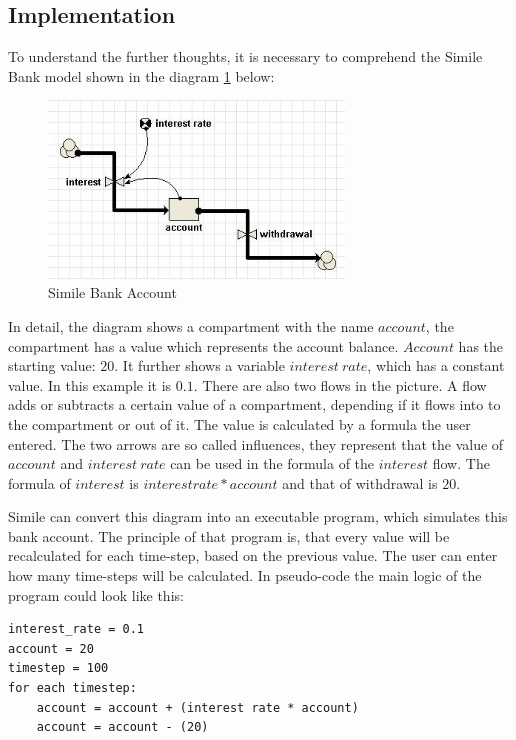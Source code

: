 \subsection{Implementation}
\par
To understand the further thoughts, it is necessary to comprehend the Simile Bank model shown in the diagram \ref{fig:simile_bank_account} below:
\begin{figure}[h]
	\centering
	\includegraphics[width=0.7\textwidth]{pics/generation_of_a_dsl/similie_bank_account.png}
	\caption{Simile Bank Account \label{fig:simile_bank_account}}	
\end{figure}
\par
In detail, the diagram shows a compartment with the name $account$, the compartment has a value which represents the account balance. $Account$ has the starting value: $20$. It further shows a variable $interest\:rate$, which has a constant value. In this example it is $0.1$. There are also two flows in the picture. A flow adds or subtracts a certain value of a compartment, depending if it flows into to the compartment or out of it. The value is calculated by a formula the user entered. The two arrows are so called influences, they represent that the value of $account$ and $interest\:rate$ can be used in the formula of the $interest$ flow. The formula of $interest$ is $interest rate * account$ and that of withdrawal is $20$.
\par
Simile can convert this diagram into an executable program, which simulates this bank account. The principle of that program is, that every value will be recalculated for each time-step, based on the previous value. The user can enter how many time-steps will be calculated. In pseudo-code the main logic of the program could look like this:
\begin{lstlisting}
interest_rate = 0.1
account = 20
timestep = 100
for each timestep:
	account = account + (interest rate * account)
	account = account - (20)
\end{lstlisting}
